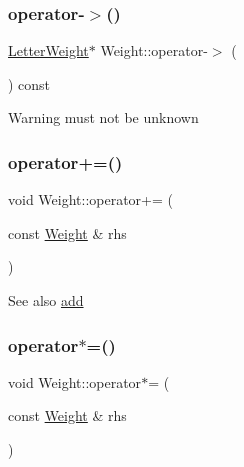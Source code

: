 \subsubsection{\texorpdfstring{operator-\/$>$()}{operator->()}}
{\footnotesize\ttfamily \mbox{\hyperlink{classLetterWeight}{Letter\+Weight}}$\ast$ Weight\+::operator-\/$>$ (\begin{DoxyParamCaption}{ }\end{DoxyParamCaption}) const\hspace{0.3cm}{\ttfamily [inline]}}

\begin{DoxyWarning}{Warning}
must not be unknown 
\end{DoxyWarning}
\mbox{\label{classWeight_a840aea7512916a91b6baf0a0772b46db}} 
\subsubsection{\texorpdfstring{operator+=()}{operator+=()}}
{\footnotesize\ttfamily void Weight\+::operator+= (\begin{DoxyParamCaption}\item[{const \mbox{\hyperlink{classWeight}{Weight}} \&}]{rhs }\end{DoxyParamCaption})\hspace{0.3cm}{\ttfamily [inline]}}

\begin{DoxySeeAlso}{See also}
\mbox{\hyperlink{group__weight_ga261db18abff49cac38bd02b8f7af94db}{add}} 
\end{DoxySeeAlso}
\mbox{\label{classWeight_a4968f430abd50a0eaea15d01422ef0bb}} 
\subsubsection{\texorpdfstring{operator$\ast$=()}{operator*=()}}
{\footnotesize\ttfamily void Weight\+::operator$\ast$= (\begin{DoxyParamCaption}\item[{const \mbox{\hyperlink{classWeight}{Weight}} \&}]{rhs }\end{DoxyParamCaption})\hspace{0.3cm}{\ttfamily [inline]}}


